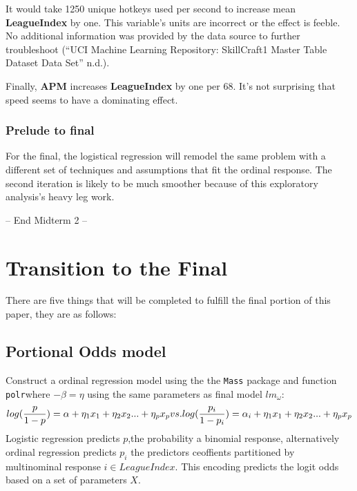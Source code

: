 \documentclass[]{article}
\begin{document}
It would take 1250 unique hotkeys used per second to increase mean
\textbf{LeagueIndex} by one. This variable's units are incorrect or the
effect is feeble. No additional information was provided by the data
source to further troubleshoot (``UCI Machine Learning Repository:
SkillCraft1 Master Table Dataset Data Set'' n.d.).

Finally, \textbf{APM} increases \textbf{LeagueIndex} by one per 68. It's
not surprising that speed seems to have a dominating effect.

\hypertarget{prelude-to-final}{%
\subsubsection{Prelude to final}\label{prelude-to-final}}

For the final, the logistical regression will remodel the same problem
with a different set of techniques and assumptions that fit the ordinal
response. The second iteration is likely to be much smoother because of
this exploratory analysis's heavy leg work.

-- End Midterm 2 --

\hypertarget{transition-to-the-final}{%
\section{Transition to the Final}\label{transition-to-the-final}}

There are five things that will be completed to fulfill the final
portion of this paper, they are as follows:

\hypertarget{portional-odds-model}{%
\subsection{Portional Odds model}\label{portional-odds-model}}

Construct a ordinal regression model using the the \texttt{Mass} package
and function \texttt{polr}where \(-\beta=\eta\) using the same
parameters as final model \(lm_\omega\):
\[log(\frac{p}{1-p})=\alpha+\eta_1x_1+\eta_2x_2...+\eta_px_p\\ vs. \\log(\frac{p_i}{1-p_i})=\alpha_i+\eta_1x_1+\eta_2x_2...+\eta_px_p\]
Logistic regression predicts \(p\),the probability a binomial response,
alternatively ordinal regression predicts \(p_i\) the predictors
ceoffients partitioned by multinominal response \(i \in LeagueIndex\).
This encoding predicts the logit odds based on a set of parameters
\(X\).
\end{document}
